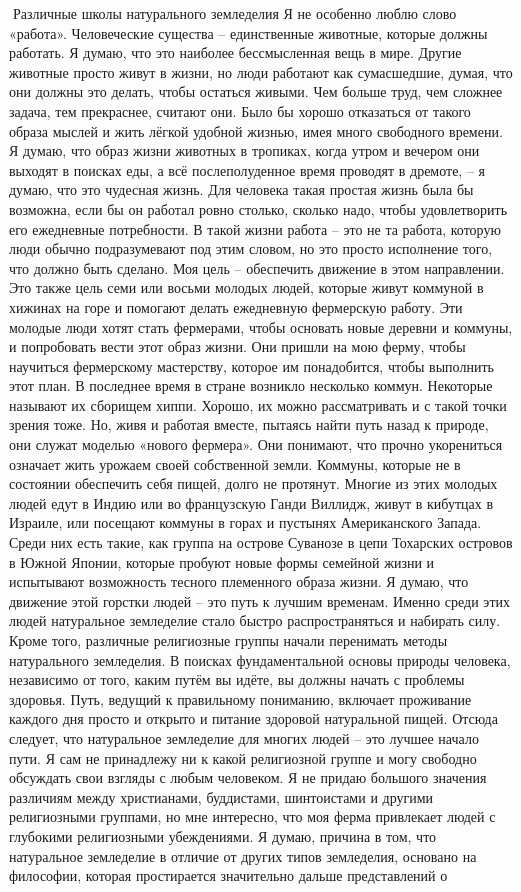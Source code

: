 \documentclass[a4paper]{book}
\begin{document}
Различные школы натурального земледелия
Я не особенно люблю слово «работа». Человеческие существа – единственные
животные, которые должны работать. Я думаю, что это наиболее бессмысленная вещь в
мире. Другие животные просто живут в жизни, но люди работают как сумасшедшие, думая,
что они должны это делать, чтобы остаться живыми. Чем больше труд, чем сложнее задача,
тем прекраснее, считают они. Было бы хорошо отказаться от такого образа мыслей и жить
лёгкой удобной жизнью, имея много свободного времени. Я думаю, что образ жизни
животных в тропиках, когда утром и вечером они выходят в поисках еды, а всё
послеполуденное время проводят в дремоте, – я думаю, что это чудесная жизнь.
Для человека такая простая жизнь была бы возможна, если бы он работал ровно
столько, сколько надо, чтобы удовлетворить его ежедневные потребности. В такой жизни
работа – это не та работа, которую люди обычно подразумевают под этим словом, но это
просто исполнение того, что должно быть сделано.
Моя цель – обеспечить движение в этом направлении. Это также цель семи или восьми
молодых людей, которые живут коммуной в хижинах на горе и помогают делать ежедневную
фермерскую работу. Эти молодые люди хотят стать фермерами, чтобы основать новые
деревни и коммуны, и попробовать вести этот образ жизни. Они пришли на мою ферму,
чтобы научиться фермерскому мастерству, которое им понадобится, чтобы выполнить этот
план.
В последнее время в стране возникло несколько коммун. Некоторые называют их
сборищем хиппи. Хорошо, их можно рассматривать и с такой точки зрения тоже. Но, живя и
работая вместе, пытаясь найти путь назад к природе, они служат моделью «нового фермера».
Они понимают, что прочно укорениться означает жить урожаем своей собственной земли.
Коммуны, которые не в состоянии обеспечить себя пищей, долго не протянут.
Многие из этих молодых людей едут в Индию или во французскую Ганди Виллидж,
живут в кибутцах в Израиле, или посещают коммуны в горах и пустынях Американского
Запада. Среди них есть такие, как группа на острове Суванозе в цепи Тохарских островов в
Южной Японии, которые пробуют новые формы семейной жизни и испытывают
возможность тесного племенного образа жизни. Я думаю, что движение этой горстки
людей – это путь к лучшим временам. Именно среди этих людей натуральное земледелие
стало быстро распространяться и набирать силу.
Кроме того, различные религиозные группы начали перенимать методы натурального
земледелия. В поисках фундаментальной основы природы человека, независимо от того,
каким путём вы идёте, вы должны начать с проблемы здоровья. Путь, ведущий к
правильному пониманию, включает проживание каждого дня просто и открыто и питание
здоровой натуральной пищей. Отсюда следует, что натуральное земледелие для многих
людей – это лучшее начало пути.
Я сам не принадлежу ни к какой религиозной группе и могу свободно обсуждать свои
взгляды с любым человеком. Я не придаю большого значения различиям между
христианами, буддистами, шинтоистами и другими религиозными группами, но мне
интересно, что моя ферма привлекает людей с глубокими религиозными убеждениями. Я
думаю, причина в том, что натуральное земледелие в отличие от других типов земледелия,
основано на философии, которая простирается значительно дальше представлений о
\end{document}
